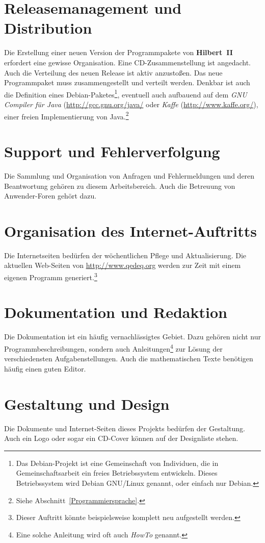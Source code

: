 \documentclass[a4paper,german,10pt,twoside]{book}
\begin{document}
{\section{Releasemanagement und Distribution}
Die Erstellung einer neuen Version der Programmpakete von \textbf{Hilbert~II} erfordert eine
gewisse Organisation. Eine CD-Zusammenstellung ist angedacht. Auch die Verteilung des neuen Release
ist aktiv anzusto{\ss}en. Das neue Programmpaket muss zusammengestellt und verteilt werden. Denkbar ist
auch die Definition eines Debian-Paketes\footnote{Das Debian-Projekt ist eine
Gemeinschaft von Individuen, die in Gemeinschaftsarbeit ein freies Betriebssystem entwickeln.
Dieses Betriebssystem wird Debian GNU/Linux genannt, oder einfach nur Debian. }, eventuell auch
aufbauend auf dem \emph{GNU Compiler f{\"u}r Java} (\url{http://gcc.gnu.org/java/} oder \emph{Kaffe}
(\url{http://www.kaffe.org/}), einer freien Implementierung von Java.\footnote{Siehe
Abschnitt~\ref{Programmiersprache}.}

\section{Support und Fehlerverfolgung}
Die Sammlung und Organisation von Anfragen und Fehlermeldungen und deren Beantwortung geh{\"o}ren zu
diesem Arbeitsbereich. Auch die Betreuung von Anwender-Foren geh{\"o}rt dazu.

\section{Organisation des Internet-Auftritts}
Die Internetseiten bed{\"u}rfen der w{\"o}chentlichen Pflege und Aktualisierung. Die aktuellen Web-Seiten
von \url{http://www.qedeq.org} werden zur Zeit mit einem eigenen Programm
generiert.\footnote{Dieser Auftritt k{\"o}nnte beispielsweise komplett neu aufgestellt werden.}

\section{Dokumentation und Redaktion}
Die Dokumentation ist ein h{\"a}ufig vernachl{\"a}ssigtes Gebiet. Dazu geh{\"o}ren nicht nur
Programmbeschreibungen, sondern auch Anleitungen\footnote{Eine solche Anleitung wird oft auch
\emph{HowTo} genannt.} zur L{\"o}sung der verschiedensten Aufgabenstellungen. Auch die mathematischen
Texte ben{\"o}tigen h{\"a}ufig einen guten Editor.

\section{Gestaltung und Design}
Die Dokumente und Internet-Seiten dieses Projekts bed{\"u}rfen der Gestaltung. Auch ein Logo oder sogar
ein CD-Cover k{\"o}nnen auf der Designliste stehen.

}
\end{document}
